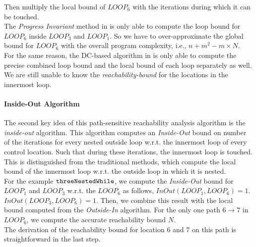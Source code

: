 Then multiply the local bound of $LOOP_6$ with the iterations during which it can be touched.
\\
The \emph{Progress Invariant} method in \cite{GulwaniJK09} is only able to compute
the loop bound for $LOOP_6$ inside $LOOP_3$ and $LOOP_1$.
So we have to over-approximate the global bound for $LOOP_6$ with the
overall program complexity, i.e., $n + m^2 - m \times N$.
\\
For the same reason, the DC-based algorithm in \cite{sinn2017complexity}
is only able to
compute the precise combined loop bound and the local bound of each loop
separately as well.
We are still unable to know the  \emph{reachability-bound} for the locations in the innermost loop.
\paragraph*{Inside-Out Algorithm}
The second key idea of this path-sensitive reachability analysis algorithm is the
\emph{inside-out} algorithm.
This algorithm computes an \emph{Inside-Out} bound on number of the iterations for
every nested outside loop w.r.t. the innermost loop of every control location.
Such that during these iterations, the innermost loop is touched. 
This is distinguished from the traditional methods, which compute the local bound
of the innermost loop w.r.t. the outside loop in which it is nested.
%
\\
For the example ${\mathtt{threeNestedWhile}}$, 
we compute the \emph{Inside-Out} bound for $LOOP_1$ and $LOOP_3$
w.r.t. the $LOOP_6$ as follows,
$InOut(LOOP_1, LOOP_6) = 1$.
\\
$InOut(LOOP_3, LOOP_6) = 1$.
Then, we combine this result with the local bound
computed from the \emph{Outside-In} algorithm.
For the only one path $6 \to 7$ in $LOOP_6$, 
we compute the accurate reachability bound $N$.
\\
The derivation of the reachability bound for location $6$ and $7$
on this path is straightforward in the last step.

